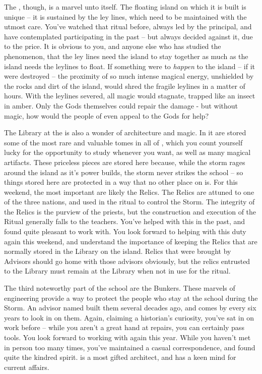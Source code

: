 \documentclass[char]{GL2020}
\begin{document}
The \pSc{}, though, is a marvel unto itself. The floating island on which it is built is unique -- it is sustained by the ley lines, which need to be maintained with the utmost care. You’ve watched that ritual before, always led by the principal, and have contemplated participating in the past -- but always decided against it, due to the price. It is obvious to you, and anyone else who has studied the phenomenon, that the ley lines need the island to stay together as much as the island needs the leylines to float. If something were to \emph{happen} to the island -- if it were destroyed -- the proximity of so much intense magical energy, unshielded by the rocks and dirt of the island, would shred the fragile leylines in a matter of hours. With the leylines severed, all magic would stagnate, trapped like an insect in amber. Only the Gods themselves could repair the damage - but without magic, how would the people of \pEarth{} even appeal to the Gods for help?

The Library at the \pSc{} is also a wonder of architecture and magic. In it are stored some of the most rare and valuable tomes in all of \pEarth{}, which you count yourself lucky for the opportunity to study whenever you want, as well as many magical artifacts. These priceless pieces are stored here because, while the storm rages around the island as it’s power builds, the storm never strikes the school -- so things stored here are protected in a way that no other place on \pEarth{} is. For this weekend, the most important are likely the Relics. The Relics are attuned to one of the three nations, and used in the ritual to control the Storm. The integrity of the Relics is the purview of the priests, but the construction and execution of the Ritual generally falls to the teachers. You’ve helped \cLibrarian{} with this in the past, and found \cLibrarian{\them} quite pleasant to work with. You look forward to helping with this duty again this weekend, and understand the importance of keeping the Relics that are normally stored in the Library on the island. Relics that were brought by Advisors should go home with those advisors obviously, but the relics entrusted to the Library must remain at the Library when not in use for the ritual.

The third noteworthy part of the school are the Bunkers. These marvels of engineering provide a way to protect the people who stay at the school during the Storm. An advisor named \cBunker{} built them several decades ago, and comes by every six years to look in on them. Again, claiming a historian’s curiosity, you’ve sat in on \cBunker{\their} work before -- while you aren’t a great hand at repairs, you can certainly pass tools. You look forward to working with \cBunker{} again this year. While you haven’t met \cBunker{\them} in person too many times, you’ve maintained a casual correspondence, and found quite the kindred spirit. \cBunker{} is a most gifted architect, and has a keen mind for current affairs. 
\end{document}
